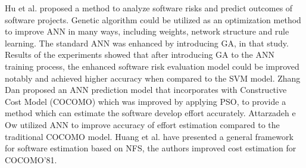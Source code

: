 Hu et al. \cite{hu2007software} proposed a method to analyze software risks and predict outcomes of software projects. Genetic algorithm could be utilized as an optimization method to improve ANN in many ways, including weights, network structure and rule learning. The standard ANN was enhanced by introducing GA, in that study. Results of the experiments showed that after introducing GA to the ANN training process, the enhanced software risk evaluation model could be improved notably and achieved higher accuracy when compared to the SVM model. Zhang Dan \cite{dan2013improving} proposed an ANN prediction model that incorporates with Constructive Cost Model (COCOMO) which was improved by applying PSO, to provide a method which can estimate the software develop effort accurately. Attarzadeh e Ow \cite{attarzadeh2010novel} utilized ANN to improve accuracy of effort estimation compared to the traditional COCOMO model. Huang et al. \cite{huang2004neuro} have presented a general framework for software estimation based on NFS, the authors improved cost estimation for COCOMO'81.


